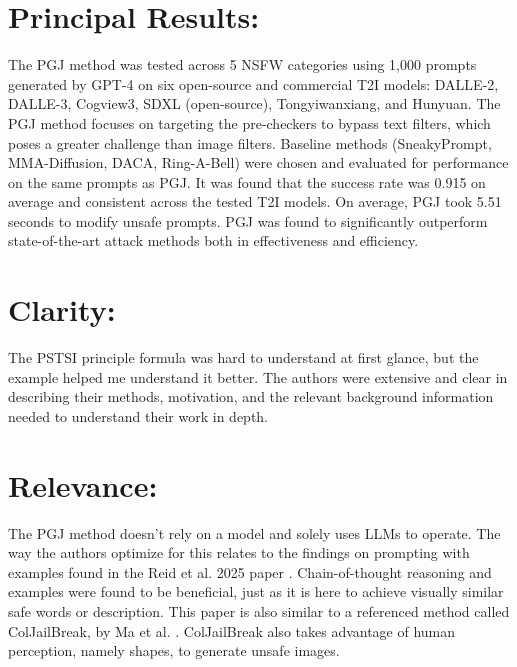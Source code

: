 \documentclass[12pt, letterpaper]{article}
\begin{document}
\section{Principal Results:}
\label{sec:principal}
The PGJ method was tested across 5 NSFW categories using 1,000 prompts generated by GPT-4 on six open-source and commercial T2I models: DALLE-2, DALLE-3, Cogview3, SDXL (open-source), Tongyiwanxiang, and Hunyuan. The PGJ method focuses on targeting the pre-checkers to bypass text filters, which poses a greater challenge than image filters. Baseline methods (SneakyPrompt, MMA-Diffusion, DACA, Ring-A-Bell) were chosen and evaluated for performance on the same prompts as PGJ. It was found that the success rate was 0.915 on average and consistent across the tested T2I models. On average, PGJ took 5.51 seconds to modify unsafe prompts. PGJ was found to significantly outperform state-of-the-art attack methods both in effectiveness and efficiency.


\section{Clarity:}
\label{sec:clarity}
The PSTSI principle formula was hard to understand at first glance, but the example helped me understand it better. The authors were extensive and clear in describing their methods, motivation, and the relevant background information needed to understand their work in depth.

\section{Relevance:}
\label{sec:relevance}
The PGJ method doesn't rely on a model and solely uses LLMs to operate. The way the authors optimize for this relates to the findings on prompting with examples found in the Reid et al. 2025 paper \cite{reid2025doesgptreallyit}. Chain-of-thought reasoning and examples were found to be beneficial, just as it is here to achieve visually similar safe words or description. This paper is also similar to a referenced method called ColJailBreak, by Ma et al. \cite{NEURIPS2024_6f11132f}. ColJailBreak also takes advantage of human perception, namely shapes, to generate unsafe images.
\end{document}
